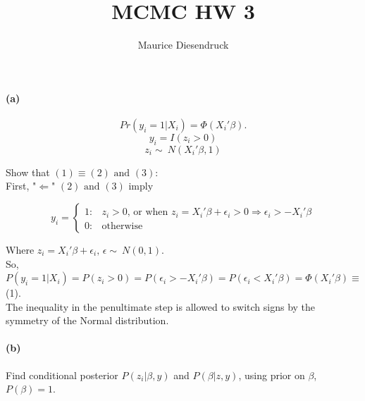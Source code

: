 \documentclass[12pt,letterpaper]{article}
\author{Maurice Diesendruck}
\title{MCMC HW 3}
\begin{document}

\maketitle


\paragraph{(a)}

\begin{equation}
Pr(y_i=1|X_i) = \Phi(X_i'\beta).
                     \end{equation}
                     \begin{equation}
                     y_i = I(z_i > 0)
                     \end{equation}
                     \begin{equation}
                     z_i \sim\ N(X_i'\beta, 1)
\end{equation}

Show that $(1) \equiv (2) \text{ and } (3)$: \\
First, "$\Leftarrow$" $(2) \text{ and } (3) \text{ imply }$
  
  \begin{displaymath}
y_i = \left\{
  \begin{array}{lr}
  1  :& z_i > 0 \text{, or when } z_i=X_i'\beta + \epsilon_i >0 \Rightarrow \epsilon_i > -X_i'\beta\\
  0  :& \text{otherwise}
  \end{array}
  \right.
  \end{displaymath}
  
  Where $z_i = X_i'\beta+\epsilon_i \text{, } \epsilon \sim\ N(0,1)$.\\
  
  So, $P(y_i=1|X_i) = P(z_i>0) = P(\epsilon_i>-X_i'\beta) = P(\epsilon_i < X_i'\beta) = \Phi(X_i'\beta) \equiv$ (1).\\

The inequality in the penultimate step is allowed to switch signs by the symmetry of the Normal distribution.\\

\paragraph{(b)}

Find conditional posterior $P(z_i|\beta, y)$ and $P(\beta|z,y)$, using prior on $\beta$, $P(\beta)=1$.\\
\end{document}

